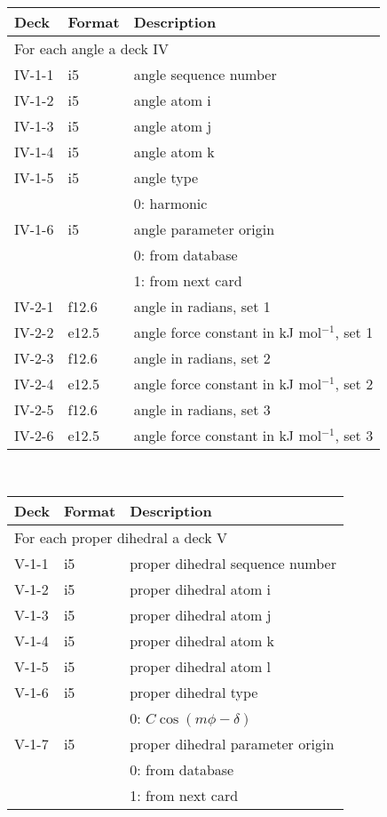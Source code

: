 \begin{center}
\begin{tabular*}{150mm}{p{12mm}p{12mm}l}
\hline\hline
Deck & Format & Description \\ \hline
\multicolumn{3}{l}{For each angle a deck IV} \\
IV-1-1 & i5     & angle sequence number \\
IV-1-2 & i5     & angle atom i \\
IV-1-3 & i5     & angle atom j \\
IV-1-4 & i5     & angle atom k \\
IV-1-5 & i5     & angle type \\
       &        & 0: harmonic\\
IV-1-6 & i5     & angle parameter origin\\
       &        & 0: from database \\
       &        & 1: from next card\\
IV-2-1 & f12.6  & angle in radians, set 1\\
IV-2-2 & e12.5  & angle force constant in kJ mol$^{-1}$, set 1 \\
IV-2-3 & f12.6  & angle in radians, set 2\\
IV-2-4 & e12.5  & angle force constant in kJ mol$^{-1}$, set 2 \\
IV-2-5 & f12.6  & angle in radians, set 3\\
IV-2-6 & e12.5  & angle force constant in kJ mol$^{-1}$, set 3 \\
\hline
\end{tabular*}\\
\begin{tabular*}{150mm}{p{12mm}p{12mm}l}
\hline\hline
Deck & Format & Description \\ \hline
\multicolumn{3}{l}{For each proper dihedral a deck V} \\
V-1-1 & i5     & proper dihedral sequence number \\
V-1-2 & i5     & proper dihedral atom i \\
V-1-3 & i5     & proper dihedral atom j \\
V-1-4 & i5     & proper dihedral atom k \\
V-1-5 & i5     & proper dihedral atom l \\
V-1-6 & i5     & proper dihedral type \\
      &        & 0: $C\cos(m\phi-\delta)$\\
V-1-7 & i5     & proper dihedral parameter origin\\
      &        & 0: from database \\
      &        & 1: from next card\\

\end{tabular*}
\end{center}
